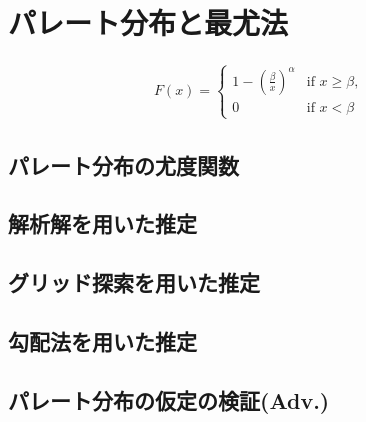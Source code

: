 \documentclass{article}
\begin{document}
\section{パレート分布と最尤法}

\begin{center}
	\begin{gather}
		F(x) = \begin{cases} 
1 - \left( \frac{\beta}{x} \right)^\alpha & \text{if } x \geq \beta, \\
0 & \text{if } x < \beta 
\end{cases}
	\end{gather}
\end{center}

\subsection{パレート分布の尤度関数}

\subsection{解析解を用いた推定}

\subsection{グリッド探索を用いた推定}

\subsection{勾配法を用いた推定}

\subsection{パレート分布の仮定の検証(Adv.)}
\end{document}
